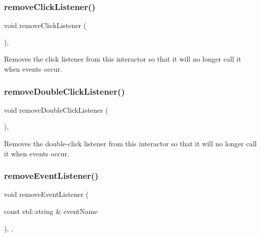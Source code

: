 \subsubsection{\texorpdfstring{remove\+Click\+Listener()}{removeClickListener()}}
{\footnotesize\ttfamily void remove\+Click\+Listener (\begin{DoxyParamCaption}{ }\end{DoxyParamCaption})\hspace{0.3cm}{\ttfamily [virtual]}, {\ttfamily [inherited]}}



Removes the click listener from this interactor so that it will no longer call it when events occur. 

\mbox{\label{classGInteractor_aa4250907e4cdd77349c04f0cf5cdd3d3}} 
\subsubsection{\texorpdfstring{remove\+Double\+Click\+Listener()}{removeDoubleClickListener()}}
{\footnotesize\ttfamily void remove\+Double\+Click\+Listener (\begin{DoxyParamCaption}{ }\end{DoxyParamCaption})\hspace{0.3cm}{\ttfamily [virtual]}, {\ttfamily [inherited]}}



Removes the double-\/click listener from this interactor so that it will no longer call it when events occur. 

\mbox{\label{classGObservable_acbcf1ed3a851ad8a3c17ef38d86b481d}} 
\subsubsection{\texorpdfstring{remove\+Event\+Listener()}{removeEventListener()}}
{\footnotesize\ttfamily void remove\+Event\+Listener (\begin{DoxyParamCaption}\item[{const std\+::string \&}]{event\+Name }\end{DoxyParamCaption})\hspace{0.3cm}{\ttfamily [protected]}, {\ttfamily [virtual]}, {\ttfamily [inherited]}}




